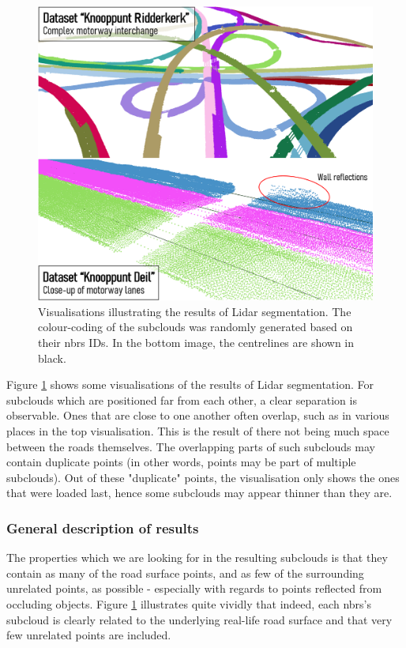 \begin{figure}
    \centering
    \includegraphics[width=0.86\linewidth]{final_report/figs/lidarsegmentation0.png}
    \caption[Visualisations illustrating the results of Lidar segmentation]{Visualisations illustrating the results of Lidar segmentation. The colour-coding of the subclouds was randomly generated based on their \ac{nbrs} IDs. In the bottom image, the centrelines are shown in black.}
    \label{fig:lidarsegmentation0}
\end{figure}

Figure \ref{fig:lidarsegmentation0} shows some visualisations of the results of Lidar segmentation. For subclouds which are positioned far from each other, a clear separation is observable. Ones that are close to one another often overlap, such as in various places in the top visualisation. This is the result of there not being much space between the roads themselves. The overlapping parts of such subclouds may contain duplicate points (in other words, points may be part of multiple subclouds). Out of these "duplicate" points, the visualisation only shows the ones that were loaded last, hence some subclouds may appear thinner than they are.

\subsubsection{General description of results}

The properties which we are looking for in the resulting subclouds is that they contain as many of the road surface points, and as few of the surrounding unrelated points, as possible - especially with regards to points reflected from occluding objects. Figure \ref{fig:lidarsegmentation0} illustrates quite vividly that indeed, each \ac{nbrs}'s subcloud is clearly related to the underlying real-life road surface and that very few unrelated points are included.

